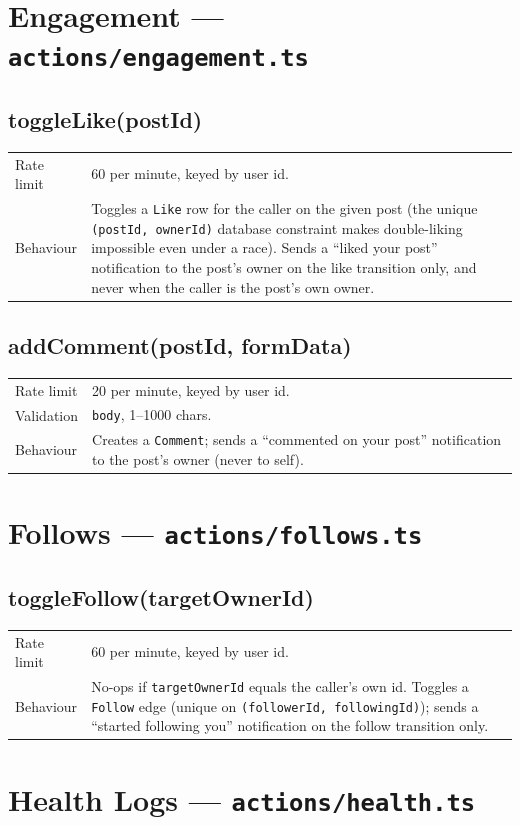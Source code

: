 \documentclass[11pt,a4paper]{article}
\makeatletter
\newcommand{\actiontable}[1]{%
  \begin{tabular}{@{}p{2.6cm}p{10.9cm}@{}}
  #1
  \end{tabular}
}
\makeatother
\begin{document}
\section{Engagement --- \texttt{actions/engagement.ts}}

\subsection{toggleLike(postId)}
\actiontable{
Rate limit & 60 per minute, keyed by user id. \\
Behaviour & Toggles a \texttt{Like} row for the caller on the given post (the unique
  \texttt{(postId, ownerId)} database constraint makes double-liking impossible even
  under a race). Sends a ``liked your post'' notification to the post's owner on the
  like transition only, and never when the caller is the post's own owner. \\
}

\subsection{addComment(postId, formData)}
\actiontable{
Rate limit & 20 per minute, keyed by user id. \\
Validation & \texttt{body}, 1--1000 chars. \\
Behaviour & Creates a \texttt{Comment}; sends a ``commented on your post'' notification
  to the post's owner (never to self). \\
}

\section{Follows --- \texttt{actions/follows.ts}}

\subsection{toggleFollow(targetOwnerId)}
\actiontable{
Rate limit & 60 per minute, keyed by user id. \\
Behaviour & No-ops if \texttt{targetOwnerId} equals the caller's own id. Toggles a
  \texttt{Follow} edge (unique on \texttt{(followerId, followingId)}); sends a
  ``started following you'' notification on the follow transition only. \\
}

\section{Health Logs --- \texttt{actions/health.ts}}
\end{document}
